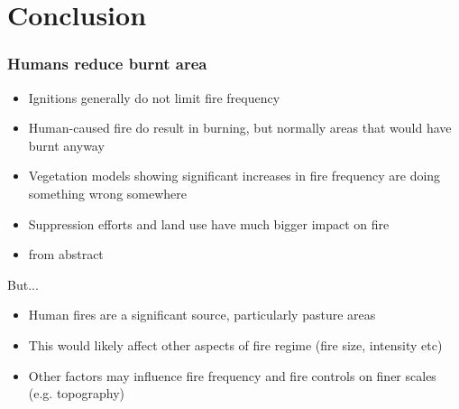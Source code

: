 \section{Conclusion}


\begin{frame}
    \frametitle{Humans reduce burnt area}

    	\begin{itemize}
    		\item Ignitions generally do not limit fire frequency
    		\item Human-caused fire do result in burning, but normally areas that would have burnt anyway
    		\item Vegetation models showing significant increases in fire frequency are doing something wrong somewhere
    		\item Suppression efforts and land use have much bigger impact on fire
    		\item from abstract

    	\end{itemize}

    	\large{But...}
    	\begin{itemize}
    		\item Human fires are a significant source, particularly pasture areas
    		\item This would likely affect other aspects of fire regime (fire size, intensity etc)
    		\item Other factors may influence fire frequency and fire controls on finer scales (e.g. topography)
    	\end{itemize}
    
\end{frame}
